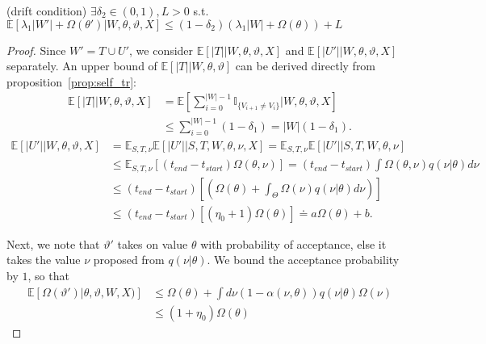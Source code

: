 \begin{lemma}(drift condition) $\exists \delta_2 \in (0, 1), L > 0$ 
  s.t. 
  $\mathbb{E}\left[\lambda_1|W'| + \Omega(\theta')  | W, \theta, \vartheta, X\right] 
  \leq (1 - \delta_2)\left(\lambda_1|W| + \Omega(\theta)   \right) + L$ %
\label{lem:drift}
\end{lemma}
\begin{proof}
Since $W'=T\cup U'$, we consider $\mathbb{E}[|T| |W,\theta,\vartheta,X]$ 
and $\mathbb{E}[|U'| | W, \theta, \vartheta, X]$ separately.
An upper bound of $\mathbb{E}[|T| | W,\theta,\vartheta]$ can be derived
directly from proposition~\ref{prop:self_tr}:
\begin{align*}
\mathbb{E}[|T| |W,\theta,\vartheta,X] &= \mathbb{E}[\sum_{i = 0}^{|W|-1} 
  \mathbb{I}_{\{ V_{i + 1} \neq V_i \}}| W, \theta, \vartheta, X]\\
&\leq \sum_{i = 0}^{|W| - 1} (1 - \delta_1) = |W|(1 - \delta_1).
\end{align*}
\begin{align*}
\mathbb{E}[|U'| |W, \theta, \vartheta, X] &= \mathbb{E}_{S,T, \nu}\mathbb{E}[|U'| | S, T, W, \theta, \nu, X] = \mathbb{E}_{S,T, \nu}\mathbb{E}[|U'| | S, T, W, \theta, \nu] \\
& \leq \mathbb{E}_{S,T, \nu} \left[(t_{end} - t_{start})\Omega(\theta, \nu)\right] = (t_{end} - t_{start})\int \Omega(\theta, \nu) q(\nu | \theta) d\nu\\
& \leq (t_{end} - t_{start})\left[ \left(  \Omega(\theta) +
\int_\Theta \Omega(\nu) q(\nu | \theta)d\nu \right) \right] \\
& \leq (t_{end} - t_{start}) \left[ (\eta_0 + 1) \Omega(\theta) \right] 
\doteq a \Omega(\theta) + b.
\end{align*}

Next, we note that $\vartheta'$ takes on value $\theta$ with 
probability of acceptance, else it takes the value $\nu$ proposed  from
$q(\nu|\theta)$. We bound the acceptance
probability by $1$, so that
\begin{align}
\mathbb{E}[\Omega(\vartheta')|\theta,\vartheta,W,X)] &\le \Omega(\theta)
+ \int d\nu (1-\alpha(\nu,\theta)) q(\nu|\theta) \Omega(\nu)\nonumber \\
  & \le (1+\eta_0) \Omega(\theta)
\end{align}


\end{proof}
